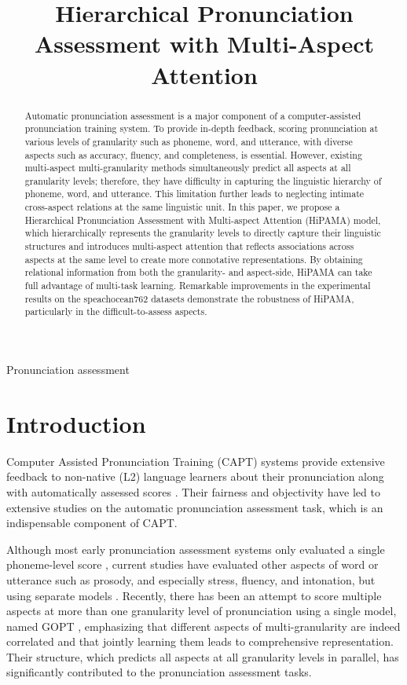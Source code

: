 \documentclass{article}
\title{Hierarchical Pronunciation Assessment with Multi-Aspect Attention}
\begin{document}
\maketitle
\begin{abstract}
Automatic pronunciation assessment is a major component of a computer-assisted pronunciation training system. To provide in-depth feedback, scoring pronunciation at various levels of granularity such as phoneme, word, and utterance, with diverse aspects such as accuracy, fluency, and completeness, is essential. However, existing multi-aspect multi-granularity methods simultaneously predict all aspects at all granularity levels; therefore, they have difficulty in capturing the linguistic hierarchy of phoneme, word, and utterance. This limitation further leads to neglecting intimate cross-aspect relations at the same linguistic unit. In this paper, we propose a Hierarchical Pronunciation Assessment with Multi-aspect Attention (HiPAMA) model, which hierarchically represents the granularity levels to directly capture their linguistic structures and introduces multi-aspect attention that reflects associations across aspects at the same level to create more connotative representations. By obtaining relational information from both the granularity- and aspect-side, HiPAMA can take full advantage of multi-task learning. Remarkable improvements in the experimental results on the speachocean762 datasets demonstrate the robustness of HiPAMA, particularly in the difficult-to-assess aspects.
\end{abstract}
\begin{keywords}
Pronunciation assessment
\end{keywords}
\section{Introduction}
\label{sec:intro}
Computer Assisted Pronunciation Training (CAPT) systems provide extensive feedback to non-native (L2) language learners about their pronunciation along with automatically assessed scores \cite{neri2002feedback, lin2020automatic}. Their fairness and objectivity have led to extensive studies on the automatic pronunciation assessment task, which is an indispensable component of CAPT.

Although most early pronunciation assessment systems only evaluated a single phoneme-level score \cite{witt2000phone, wang2012improved, shi2020context}, current studies have evaluated other aspects of word or utterance such as prosody, and especially stress, fluency, and intonation, but using separate models \cite{1415269, cucchiarini2000quantitative, li2017intonation}. Recently, there has been an attempt to score multiple aspects at more than one granularity level of pronunciation using a single model, named GOPT \cite{gong2022transformer}, emphasizing that different aspects of multi-granularity are indeed correlated and that jointly learning them leads to comprehensive representation. Their structure, which predicts all aspects at all granularity levels in parallel, has significantly contributed to the pronunciation assessment tasks.
\end{document}
